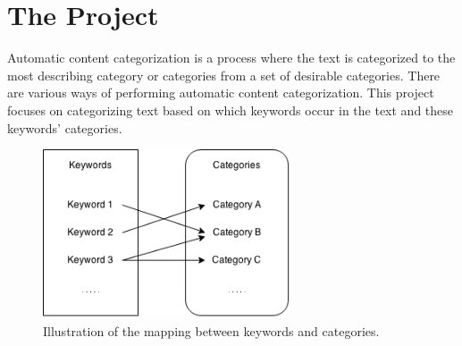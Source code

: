\section{The Project}
\label{sec:the_project}
Automatic content categorization is a process where the text is categorized to the most describing category or categories from a set of desirable categories. There are various ways of performing automatic content categorization. This project focuses on categorizing text based on which keywords occur in the text and these keywords' categories. 

\begin{figure}[h]
\centering
\includegraphics[width=0.65\textwidth]{Chapters/Introduction/keywordstocategories}
\caption{Illustration of the mapping between keywords and categories.}
\label{fig:keywordstocategories}
\end{figure}


